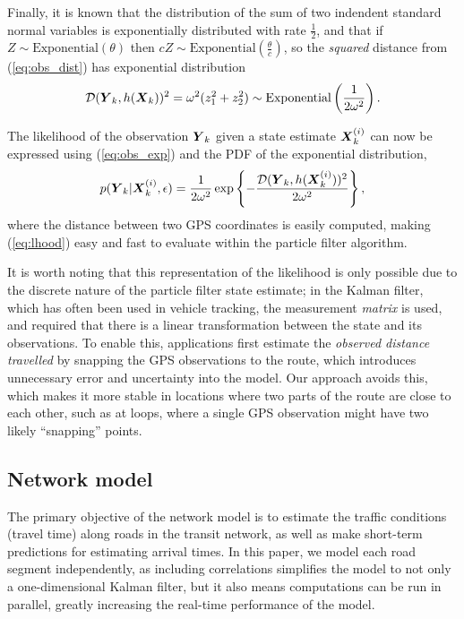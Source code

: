 Finally, it is known that the distribution of the sum of two indendent 
standard normal variables is exponentially distributed with rate $\frac{1}{2}$,
and that if $Z \sim \mathrm{Exponential}(\theta)$ then
$cZ \sim \mathrm{Exponential}(\frac{\theta}{c})$,
so the \emph{squared} distance from (\ref{eq:obs_dist}) has exponential distribution
\begin{equation}
\label{eq:obs_exp}
\mathcal{D}(\mbox{$\boldsymbol{Y}$}_k, h(\mbox{$\boldsymbol{X}$}_k))^2 =
\omega^2(z_1^2 + z_2^2) \sim \mathrm{Exponential}\left(\frac{1}{2\omega^2}\right).
\end{equation}

The likelihood of the observation $\mbox{$\boldsymbol{Y}$}_k$ given a state estimate $\mbox{$\boldsymbol{X}$}_k^{(i)}$
can now be expressed using (\ref{eq:obs_exp}) and the PDF of the exponential distribution,
\begin{equation}
\label{eq:lhood}
p(\mbox{$\boldsymbol{Y}$}_k | \mbox{$\boldsymbol{X}$}_k^{(i)}, \epsilon) =
\frac{1}{2\omega^2}\exp\left\{
    -\frac{\mathcal{D}(\mbox{$\boldsymbol{Y}$}_k, h(\mbox{$\boldsymbol{X}$}_k^{(i)}))^2}{2\omega^2}
\right\},
\end{equation}
where the distance between two GPS coordinates is easily computed,
making (\ref{eq:lhood}) easy and fast to evaluate within the particle filter algorithm.


It is worth noting that this representation of the likelihood is only
possible due to the discrete nature of the particle filter state estimate;
in the Kalman filter, which has often been used in vehicle tracking,
the measurement \emph{matrix} is used, and required that there is a linear
transformation between the state and its observations.
To enable this, applications first estimate the \emph{observed distance travelled}
by snapping the GPS observations to the route,
which introduces unnecessary error and uncertainty into the model.
Our approach avoids this, which makes it more stable in locations where two 
parts of the route are close to each other,
such as at loops, where a single GPS observation might have two likely ``snapping'' points.


\subsection{Network model}
\label{sec:kf}

The primary objective of the network model is to estimate the \rt traffic conditions
(travel time) along roads in the transit network, 
as well as make short-term predictions for estimating arrival times.
In this paper, we model each road segment independently,
as including correlations simplifies the model to not only a one-dimensional Kalman filter,
but it also means computations can be run in parallel,
greatly increasing the real-time performance of the model.


